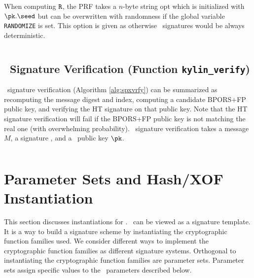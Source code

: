 When computing $\tt{R}$, the PRF takes a $n$-byte string opt which is initialized with $\pk.\seed$ but can be overwritten with randomness if the global variable \texttt{RANDOMIZE} is set. This option is given as otherwise \SPHINCSA\ signatures would be always deterministic.  

\begin{algorithm}[ht]
    \inputminted[breaklines,linenos,tabsize=2,mathescape,escapeinside=||]{C}{paper/code/kylin_sign.cs}
    \caption{ \texttt{kylin\_sign} --- Generating a \SPHINCSA\ signature.}
    \label{alg:spxsign}
\end{algorithm}

\subsection{\SPHINCSA\ Signature Verification (Function \texttt{kylin\_verify})}

\SPHINCSA\ signature verification (Algorithm \ref{alg:spxvrfy}) can be
summarized as recomputing the message digest and index, computing a candidate
BPORS+FP public key, and verifying the HT signature on that public key. Note
that the HT signature verification will fail if the BPORS+FP public key is not
matching the real one (with overwhelming probability). \SPHINCSA\ signature
verification takes a message $M$, a signature \sig, and a \SPHINCSA\ public
key $\pk$.

\begin{algorithm}[ht]
    \inputminted[breaklines,linenos,tabsize=2,mathescape,escapeinside=||]{C}{paper/code/kylin_verify.cs}
    \caption{ \texttt{kylin\_verify} --- Verify a \SPHINCSA\ signature $\bf SIG$ on a message $M$ using a \SPHINCSA\ public key $\bf PK$.}
    \label{alg:spxvrfy}
\end{algorithm}

\section{Parameter Sets and Hash/XOF Instantiation}
\label{sec:instantiations}

This section discusses instantiations for \SPHINCSA. \SPHINCSA\ can be viewed as a signature template. It is a way to build a signature scheme by instantiating the cryptographic function families used. We consider different ways to implement the cryptographic function families as different signature systems. Orthogonal to instantiating the cryptographic function families are parameter sets. Parameter sets assign specific values to the \SPHINCSA\ parameters described below.

